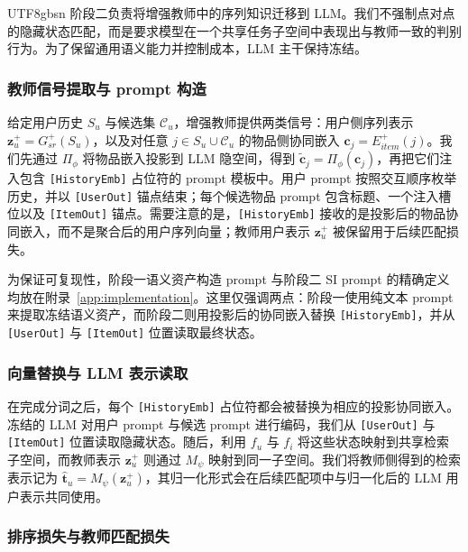\documentclass{article}
\begin{document}
\begin{CJK*}{UTF8}{gbsn}
阶段二负责将增强教师中的序列知识迁移到 LLM。我们不强制点对点的隐藏状态匹配，而是要求模型在一个共享任务子空间中表现出与教师一致的判别行为。为了保留通用语义能力并控制成本，LLM 主干保持冻结。

\subsubsection{教师信号提取与 prompt 构造}

给定用户历史 $S_u$ 与候选集 $\mathcal{C}_u$，增强教师提供两类信号：用户侧序列表示 $\mathbf{z}_u^{+}=G_{sr}^{+}(S_u)$，以及对任意 $j\in S_u\cup\mathcal{C}_u$ 的物品侧协同嵌入 $\mathbf{c}_j=E_{item}^{+}(j)$。我们先通过 $\Pi_{\phi}$ 将物品嵌入投影到 LLM 隐空间，得到 $\tilde{\mathbf{c}}_j=\Pi_{\phi}(\mathbf{c}_j)$，再把它们注入包含 \texttt{[HistoryEmb]} 占位符的 prompt 模板中。用户 prompt 按照交互顺序枚举历史，并以 \texttt{[UserOut]} 锚点结束；每个候选物品 prompt 包含标题、一个注入槽位以及 \texttt{[ItemOut]} 锚点。需要注意的是，\texttt{[HistoryEmb]} 接收的是投影后的物品协同嵌入，而不是聚合后的用户序列向量；教师用户表示 $\mathbf{z}_u^{+}$ 被保留用于后续匹配损失。

为保证可复现性，阶段一语义资产构造 prompt 与阶段二 SI prompt 的精确定义均放在附录~\ref{app:implementation}。这里仅强调两点：阶段一使用纯文本 prompt 来提取冻结语义资产，而阶段二则用投影后的协同嵌入替换 \texttt{[HistoryEmb]}，并从 \texttt{[UserOut]} 与 \texttt{[ItemOut]} 位置读取最终状态。

\subsubsection{向量替换与 LLM 表示读取}

在完成分词之后，每个 \texttt{[HistoryEmb]} 占位符都会被替换为相应的投影协同嵌入。冻结的 LLM 对用户 prompt 与候选 prompt 进行编码，我们从 \texttt{[UserOut]} 与 \texttt{[ItemOut]} 位置读取隐藏状态。随后，利用 $f_u$ 与 $f_i$ 将这些状态映射到共享检索子空间，而教师表示 $\mathbf{z}_u^{+}$ 则通过 $M_{\psi}$ 映射到同一子空间。我们将教师侧得到的检索表示记为 $\hat{\mathbf{t}}_u=M_{\psi}(\mathbf{z}_u^{+})$，其归一化形式会在后续匹配项中与归一化后的 LLM 用户表示共同使用。

\subsubsection{排序损失与教师匹配损失}


\end{CJK*}
\end{document}
